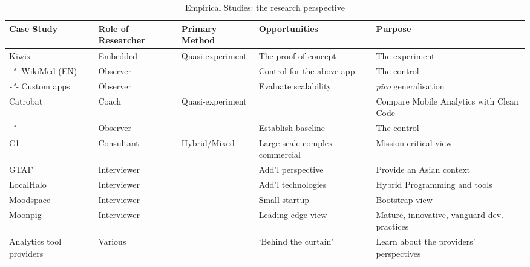 \begin{table}
    \centering
    \tabcolsep=0.06cm
    \tiny
    \begin{tabular}{lllll}\toprule
    Case Study                 & Role of Researcher &  Primary Method   & Opportunities             & Purpose \\
    \midrule
    Kiwix                      & Embedded           & Quasi-experiment   &The proof-of-concept      & The experiment \\ 
     \textit{-"-} WikiMed (EN) & Observer           &                    &Control for the above app & The control  \\
    \textit{-"-} Custom apps   & Observer           &                    & Evaluate scalability     & \textit{pico} generalisation \\
    \midrule
    Catrobat                   & Coach              & Quasi-experiment   &                          & Compare Mobile Analytics with Clean Code \\
     \textit{-"-}              & Observer           &                    & Establish baseline       & The control  \\
     \midrule
    C1                         & Consultant         & Hybrid/Mixed & Large scale complex commercial & Mission-critical view \\
    GTAF                       & Interviewer        & & Add'l perspective & Provide an Asian context \\
    LocalHalo                  & Interviewer        & & Add'l technologies & Hybrid Programming and tools \\
    Moodspace                  & Interviewer        & & Small startup &Bootstrap view \\
    Moonpig                    & Interviewer        & & Leading edge view & Mature, innovative, vanguard dev. practices \\
    Analytics tool providers   & Various            & & `Behind the curtain' & Learn about the providers' perspectives \\
    \bottomrule
    \end{tabular}
    \caption{Empirical Studies: the research perspective}
    \label{tab:empirical-studies-research-perspective}
\end{table}


